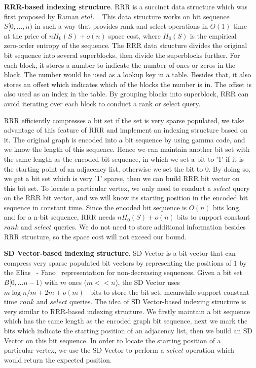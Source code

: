 \documentclass[12pt,glossary]{dalthesis}
\begin{document}
\bigskip
\bigskip

\textbf{RRR-based indexing structure}. RRR is a succinct data structure which was first proposed by Raman $et al$.~\cite{RRR}. This data structure works on bit sequence $S[0,...,n)$ in such a way that provides rank and select operations in $O(1)$ time at the price of $nH_{0}(S)+o(n)$ space cost, where $H_{0}(S)$ is the empirical zero-order entropy of the sequence. The RRR data structure divides the original bit sequence into several superblocks, then divide the superblocks further. For each block, it stores a number to indicate the number of ones or zeros in the block. The number would be used as a lookup key in a table. Besides that, it also stores an offset which indicates which of the blocks the number is in. The offset is also used as an index in the table. By grouping blocks into superblock, RRR can avoid iterating over each block to conduct a rank or select query. 

\bigskip
\bigskip

RRR efficiently compresses a bit set if the set is very sparse populated, we take advantage of this feature of RRR and implement an indexing structure based on it. The original graph is encoded into a bit sequence by using gamma code, and we know the length of this sequence. Hence we can maintain another bit set with the same length as the encoded bit sequence, in which we set a bit to '1' if it is the starting point of an adjacency list, otherwise we set the bit to 0. By doing so, we get a bit set which is very '1' sparse, then we can build RRR bit vector on this bit set. To locate a particular vertex, we only need to conduct a $select$ query on the RRR bit vector, and we will know its starting position in the encoded bit sequence in constant time. Since the encoded bit sequence is $O(n)$ bits long, and for a n-bit sequence, RRR needs $nH_{0}(S)+o(n)$ bits to support constant $rank$ and $select$ queries. We do not need to store additional information besides RRR structure, so the space cost will not exceed our bound. 

\bigskip
\bigskip

\textbf{SD Vector-based indexing structure}. SD Vector is a bit vector that can compress very sparse populated bit vectors by representing the positions of 1 by the Elias~\cite{Elias} - Fano~\cite{Fano} representation for non-decreasing sequences. Given a bit set $B[0,...n-1)$ with $m$ ones ($m << n$),   the SD Vector uses $m \log n/m  + 2m + o(m)$~\cite{Practical-Entropy} bits to store the bit set, meanwhile support constant time $rank$ and $select$ queries. The idea of SD Vector-based indexing structure is very similar to RRR-based indexing structure. We firstly maintain a bit sequence which has the same length as the encoded graph bit sequence, next we mark the bits which indicate the starting position of an adjacency list, then we build an SD Vector on this bit sequence. In order to locate the starting position of a particular vertex, we use the SD Vector to perform a $select$ operation which would return the expected position. 
\end{document}
